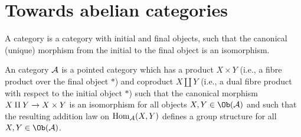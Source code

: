 \documentclass[a4paper,parskip=half,numbers=enddot, DIV=12]{scrreprt}
\begin{document}
\section{Towards abelian categories}
\begin{defi}
	\begin{alphanumerate}
		\item {}A  category is a category with initial and final objects, such that the canonical (unique) morphism from the initial to the final object is an isomorphism.
		\item An  category $\mathcal{A}$ is a pointed category which has a product $X\times Y$ (i.e., a fibre product over the final object $*$) and coproduct $X\amalg Y$ (i.e., a dual fibre product with respect to the initial object $*$) such that the canonical morphism $X\amalg Y\morphism X\times Y$ is an isomorphism for all objects $X,Y\in\Ob(\Aa)$ and such that the resulting addition law on $\operatorname{Hom}_{\mathcal{A}}(X,Y)$ defines a group structure for all $X,Y\in\Ob(\Aa)$.
	\end{alphanumerate}
\end{defi}
\end{document}
